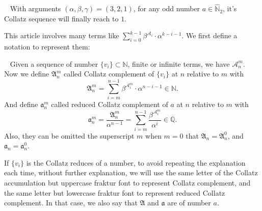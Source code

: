 \begin{conjecture}~\label{definition:rewritten-conjecture}
With arguments $(\alpha, \beta, \gamma) = (3, 2, 1)$,
for any odd number $a \in \widehat{\mathbb{N}}_{2}$, it's Collatz sequence will finally reach to $1$.
\end{conjecture}

This article involves many terms like $\textstyle \sum_{i = 0}^{k - 1}\beta^{\mathcal{A}_i}\cdot \alpha^{k-i-1}$. We first define a notation to represent them:
\begin{definition}~\label{definition:collatz-complement}
    Given a sequence of number $\{v_{i}\}\subset\mathbb{N}$, finite or infinite terms, we have $\mathcal{A}_{n}^{m}$. Now we define $\mathfrak{A}_n^{m}$ called Collatz complement of $\{v_{i}\}$ at $n$ relative to $m$ with
    \[ \mathfrak{A}_n^{m} = \sum_{i = m}^{n - 1}\beta^{\mathcal{A}_i^{m}}\cdot\alpha^{n-i-1} \in \mathbb{N}. \]
    And define $\mathfrak{a}_n^{m}$ called reduced Collatz complement of $a$ at $n$ relative to $m$ with
    \[ \mathfrak{a}_n^{m} = \frac{\mathfrak{A}_n^{m}}{\alpha^{n-1}} = \sum_{i = m}^{n - 1}\frac{\beta^{\mathcal{A}_i^{m}}}{\alpha^{i}} \in \mathbb{Q}. \]
    Also, they can be omitted the superscript $m$ when $m = 0$ that $\mathfrak{A}_n = \mathfrak{A}_n^{0}$, and $\mathfrak{a}_n = \mathfrak{a}_n^{0}$.
\end{definition}

If $\{v_{i}\}$ is the Collatz reduces of a number, to avoid repeating the explanation each time, without further explanation, we will use the same letter of the Collatz accumulation but uppercase fraktur font to represent Collatz complement, and the same letter but lowercase fraktur font to represent reduced Collatz complement.
In that case, we also say that $\mathfrak{A}$ and $\mathfrak{a}$ are of number $a$.

